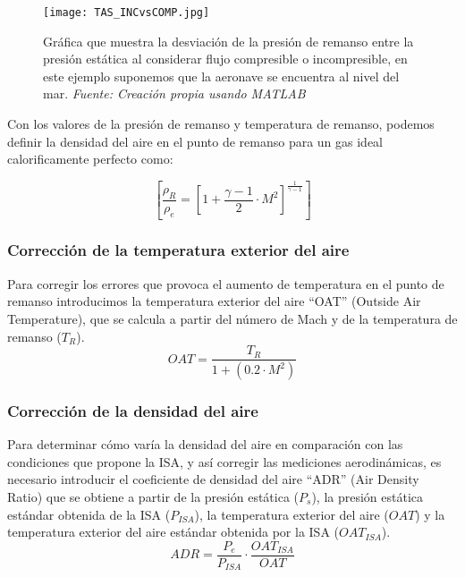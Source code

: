 \begin{figure}[H] 
    \centering
    \texttt{[image: TAS\_INCvsCOMP.jpg]}
    \caption{\centering Gráfica que muestra la desviación de la presión de remanso entre la presión estática al considerar flujo compresible o incompresible, en este ejemplo suponemos que la aeronave se encuentra al nivel del mar. \textit{Fuente: Creación propia usando MATLAB}}
    \label{fig:graficatas}
\end{figure}

Con los valores de la presión de remanso y temperatura de remanso, podemos definir la densidad del aire en el punto de remanso para un gas ideal calorificamente perfecto como:

\begin{definicion}
	\begin{equation}
		\left[\frac{\rho_R}{\rho_e} = \left[ 1 + \frac{\gamma - 1}{2} \cdot M^2 \right]^{\frac{1}{\gamma - 1}}\right]
	\end{equation}
\end{definicion}

\subsubsection{Corrección de la temperatura exterior del aire}
Para corregir los errores que provoca el aumento de temperatura en el punto de remanso introducimos la temperatura exterior del aire ``OAT'' (Outside Air Temperature), que se calcula a partir del número de Mach y de la temperatura de remanso (\( T_R \)).
\begin{equation}
OAT = \frac{T_R}{1 + (0.2 \cdot M^2)}
\end{equation}

\subsubsection{Corrección de la densidad del aire}

Para determinar cómo varía la densidad del aire en comparación con las condiciones que propone la ISA, y así corregir las mediciones aerodinámicas, es necesario introducir el coeficiente de densidad del aire ``ADR'' (Air Density Ratio) que se obtiene a partir de la presión estática (\( P_s \)), la presión estática estándar obtenida de la ISA (\( P_{ISA} \)), la temperatura exterior del aire (\( OAT \)) y la temperatura exterior del aire estándar obtenida por la ISA (\( OAT_{ISA} \)).
\begin{equation}
ADR = \frac{P_e}{P_{ISA}} \cdot \frac{OAT_{ISA}}{OAT}
\end{equation}

